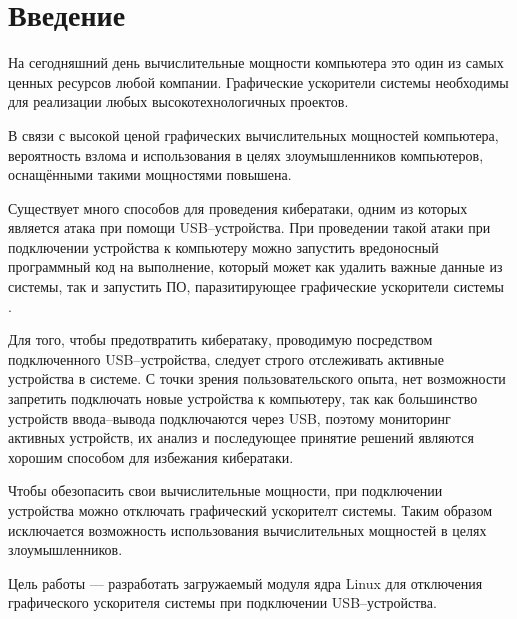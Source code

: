 \chapter*{Введение}

На сегодняшний день вычислительные мощности компьютера это один из самых ценных ресурсов любой компании. Графические ускорители системы необходимы для реализации любых высокотехнологичных проектов.

В связи с высокой ценой графических вычислительных мощностей компьютера, вероятность взлома и использования в целях злоумышленников компьютеров, оснащёнными такими мощностями повышена. 

Существует много способов для проведения кибератаки, одним из которых является атака при помощи USB--устройства. При проведении такой атаки при подключении устройства к компьютеру можно запустить вредоносный программный код на выполнение, который может как удалить важные данные из системы, так и запустить ПО, паразитирующее графические ускорители системы \cite{usbmalware}.

Для того, чтобы предотвратить кибератаку, проводимую посредством подключенного USB--устройства, следует строго отслеживать активные устройства в системе. С точки зрения пользовательского опыта, нет возможности запретить подключать новые устройства к компьютеру, так как большинство устройств ввода--вывода подключаются через USB, поэтому мониторинг активных устройств, их анализ и последующее принятие решений являются хорошим способом для избежания кибератаки.

Чтобы обезопасить свои вычислительные мощности, при подключении устройства можно отключать графический ускорителт системы. Таким образом исключается возможность использования вычислительных мощностей в целях злоумышленников.

Цель работы --- разработать загружаемый модуля ядра Linux для отключения графического ускорителя системы при подключении USB--устройства.